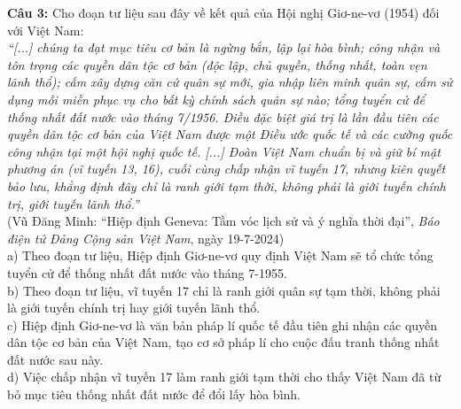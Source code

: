 \documentclass[12pt,a4paper]{article}
\begin{document}
\noindent \textbf{Câu 3:} Cho đoạn tư liệu sau đây về kết quả của Hội nghị Giơ-ne-vơ (1954) đối với Việt Nam:\\
\textit{``[...] chúng ta đạt mục tiêu cơ bản là ngừng bắn, lập lại hòa bình; công nhận và tôn trọng các quyền dân tộc cơ bản (độc lập, chủ quyền, thống nhất, toàn vẹn lãnh thổ); cấm xây dựng căn cứ quân sự mới, gia nhập liên minh quân sự, cấm sử dụng mỗi miền phục vụ cho bất kỳ chính sách quân sự nào; tổng tuyển cử để thống nhất đất nước vào tháng 7/1956. Điều đặc biệt giá trị là lần đầu tiên các quyền dân tộc cơ bản của Việt Nam được một Điều ước quốc tế và các cường quốc công nhận tại một hội nghị quốc tế. [...] Đoàn Việt Nam chuẩn bị và giữ bí mật phương án (vĩ tuyến 13, 16), cuối cùng chấp nhận vĩ tuyến 17, nhưng kiên quyết bảo lưu, khẳng định đây chỉ là ranh giới tạm thời, không phải là giới tuyến chính trị, giới tuyến lãnh thổ.''}\\
\hspace*{\fill}(Vũ Đăng Minh: ``Hiệp định Geneva: Tầm vóc lịch sử và ý nghĩa thời đại'', \textit{Báo điện tử Đảng Cộng sản Việt Nam}, ngày 19-7-2024)\\
\noindent a) Theo đoạn tư liệu, Hiệp định Giơ-ne-vơ quy định Việt Nam sẽ tổ chức tổng tuyển cử để thống nhất đất nước vào tháng 7-1955.\\


\noindent b) Theo đoạn tư liệu, vĩ tuyến 17 chỉ là ranh giới quân sự tạm thời, không phải là giới tuyến chính trị hay giới tuyến lãnh thổ.\\


\noindent c) Hiệp định Giơ-ne-vơ là văn bản pháp lí quốc tế đầu tiên ghi nhận các quyền dân tộc cơ bản của Việt Nam, tạo cơ sở pháp lí cho cuộc đấu tranh thống nhất đất nước sau này.\\


\noindent d) Việc chấp nhận vĩ tuyến 17 làm ranh giới tạm thời cho thấy Việt Nam đã từ bỏ mục tiêu thống nhất đất nước để đổi lấy hòa bình.
\end{document}

